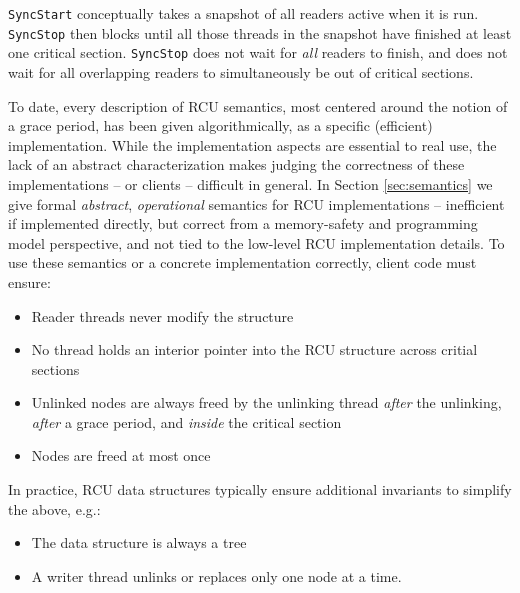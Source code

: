 \lstinline|SyncStart| conceptually takes a snapshot of all readers active when it is run.
\lstinline|SyncStop| then blocks until all those threads in the snapshot have finished at least one critical section.
\lstinline|SyncStop| does not wait for \emph{all} readers to finish, and does not wait for all overlapping readers to simultaneously be out of critical sections.

To date, every description of RCU semantics, most centered around the notion of a grace period, has been given algorithmically, as a specific (efficient) implementation.  While the implementation aspects are essential to real use, the lack of an abstract characterization makes judging the correctness of these implementations -- or clients -- difficult in general. In Section \ref{sec:semantics} we give formal \emph{abstract}, \emph{operational} semantics for RCU implementations -- inefficient if implemented directly, but correct from a memory-safety and programming model perspective, and not tied to the low-level RCU implementation details.
To use these semantics or a concrete implementation correctly, client code must ensure:
\begin{itemize}
\item Reader threads never modify the structure
\item No thread holds an interior pointer into the RCU structure across critial sections
\item Unlinked nodes are always freed by the unlinking thread \emph{after} the unlinking, \emph{after} a grace period, and \emph{inside} the critical section
\item Nodes are freed at most once
\end{itemize}
In practice, RCU data structures typically ensure additional invariants to simplify the above, e.g.:
\begin{itemize}
\item The data structure is always a tree
\item A writer thread unlinks or replaces only one node at a time. 
\end{itemize}
